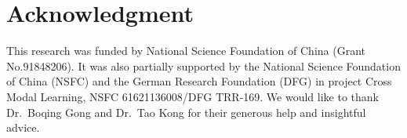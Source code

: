 \documentclass[letterpaper]{article} %
\begin{document}
\section*{Acknowledgment}
This research was funded by National Science Foundation of China (Grant No.91848206). It was also partially supported by the National Science Foundation of China (NSFC) and the German Research Foundation (DFG) in project Cross Modal Learning, NSFC 61621136008/DFG TRR-169. We would like to thank Dr.~Boqing Gong and Dr.~Tao Kong for their generous help and insightful advice.


{\fontsize{9pt}{10pt} \selectfont %


}
\end{document}
